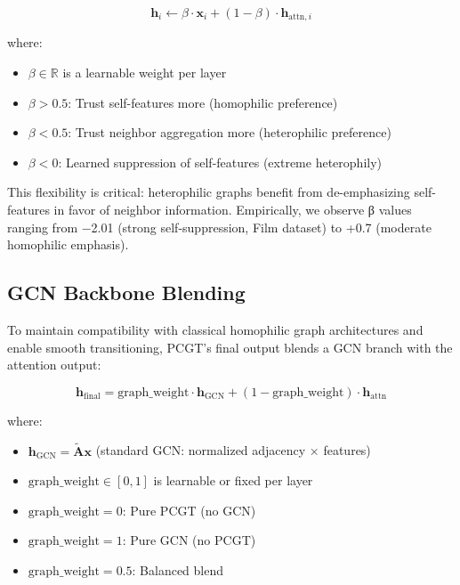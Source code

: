 \documentclass[11pt, a4paper]{article}
\begin{document}
\begin{equation}
\mathbf{h}_{i} \leftarrow \beta \cdot \mathbf{x}_i + (1 - \beta) \cdot \mathbf{h}_{\text{attn}, i}
\end{equation}

where:
\begin{itemize}
    \item $\beta \in \mathbb{R}$ is a learnable weight per layer
    \item $\beta > 0.5$: Trust self-features more (homophilic preference)
    \item $\beta < 0.5$: Trust neighbor aggregation more (heterophilic preference)
    \item $\beta < 0$: Learned suppression of self-features (extreme heterophily)
\end{itemize}

This flexibility is critical: heterophilic graphs benefit from de-emphasizing self-features in favor of neighbor information. Empirically, we observe β values ranging from −2.01 (strong self-suppression, Film dataset) to +0.7 (moderate homophilic emphasis).

\subsection{GCN Backbone Blending}

To maintain compatibility with classical homophilic graph architectures and enable smooth transitioning, PCGT's final output blends a GCN branch with the attention output:

\begin{equation}
\mathbf{h}_{\text{final}} = \text{graph\_weight} \cdot \mathbf{h}_{\text{GCN}} + (1 - \text{graph\_weight}) \cdot \mathbf{h}_{\text{attn}}
\end{equation}

where:
\begin{itemize}
    \item $\mathbf{h}_{\text{GCN}} = \tilde{\mathbf{A}} \mathbf{x}$ (standard GCN: normalized adjacency × features)
    \item $\text{graph\_weight} \in [0, 1]$ is learnable or fixed per layer
    \item $\text{graph\_weight} = 0$: Pure PCGT (no GCN)
    \item $\text{graph\_weight} = 1$: Pure GCN (no PCGT)
    \item $\text{graph\_weight} = 0.5$: Balanced blend
\end{itemize}
\end{document}
